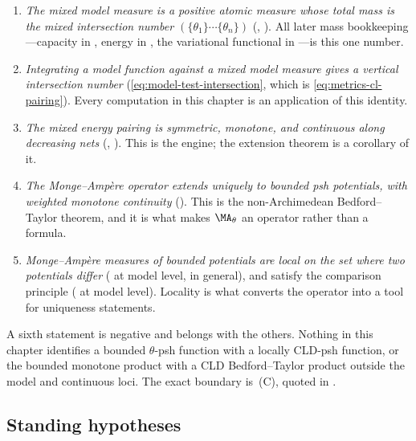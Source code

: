 \begin{enumerate}
\item \emph{The mixed model measure is a positive atomic measure whose total
 mass is the mixed intersection number \((\{\theta_1\}\cdots\{\theta_n\})\)}
 (, ).  All later mass
 bookkeeping---capacity in , energy in
 , the variational functional in
 ---is this one number.
\item \emph{Integrating a model function against a mixed model measure gives
 a vertical intersection number} (\eqref{eq:model-test-intersection}, which
 is \eqref{eq:metrics-cl-pairing}).  Every computation in this chapter is
 an application of this identity.
\item \emph{The mixed energy pairing is symmetric, monotone, and continuous
 along decreasing nets} (,
 ).  This is the engine; the extension
 theorem is a corollary of it.
\item \emph{The Monge--Amp\`ere operator extends uniquely to bounded psh
 potentials, with weighted monotone continuity}
 ().  This is the non-Archimedean
 Bedford--Taylor theorem, and it is what makes \(\MA_\theta\) an operator
 rather than a formula.
\item \emph{Monge--Amp\`ere measures of bounded potentials are local on the
 set where two potentials differ} ( at
 model level,  in general), and satisfy
 the comparison principle ( at model
 level).  Locality is what converts the operator into a tool for uniqueness
 statements.
\end{enumerate}

A sixth statement is negative and belongs with the others.  Nothing in this
chapter identifies a bounded \(\theta\)-psh function with a locally CLD-psh
function, or the bounded monotone product with a CLD Bedford--Taylor product
outside the model and continuous loci.  The exact boundary is
\,(C), quoted in
.

\subsection{Standing hypotheses}
\label{sec:ch24-hypotheses}

